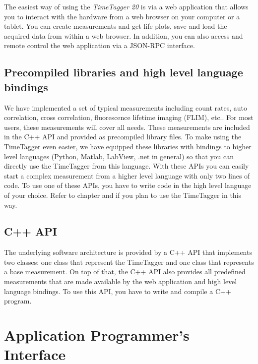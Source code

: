 \documentclass[letterpaper,10pt,english]{sphinxmanual}
\begin{document}
The easiest way of using the \emph{TimeTagger 20} is via a web application
that allows you to interact with the hardware from a web browser on your computer
or a tablet. You can create measurements
and get life plots, save and load the acquired data from within a web browser.
In addition, you can also access and remote control the web application
via a JSON-RPC interface.


\section{Precompiled libraries and high level language bindings}
\label{sections/software:precompiled-libraries-and-high-level-language-bindings}
We have implemented a set of typical measurements including count rates, auto
correlation, cross correlation, fluorescence lifetime imaging (FLIM), etc..
For most users, these measurements
will cover all needs. These measurements are included in
the C++ API and provided as precompiled library files. To make using the
TimeTagger even easier, we have equipped these libraries with
bindings to higher level languages (Python, Matlab, LabView, .net in general) so that you can directly
use the TimeTagger from this language.
With these APIs you can easily start a complex
measurement from a higher level language with only two lines of code.
To use one of these APIs, you have to write code in the high
level language of your choice. Refer to chapter {\hyperref[sections/gettingStarted:quickstart]{}} and {\hyperref[sections/api:api]{}}
if you plan to use the TimeTagger in this way.


\section{C++ API}
\label{sections/software:c-api}
The underlying software architecture is provided by a C++ API that implements
two classes: one class that represent the TimeTagger and one class that
represents a base measurement. On top of that, the C++ API also provides
all predefined measurements that are made available by the web
application and high level language bindings. To use this API, you have to
write and compile a C++ program.


\chapter{Application Programmer's Interface}
\label{sections/api:api}\label{sections/api::doc}\label{sections/api:application-programmer-s-interface}
\end{document}
